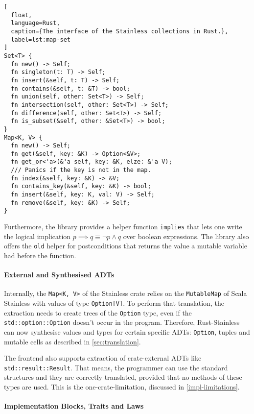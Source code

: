 \begin{lstlisting}[
  float,
  language=Rust,
  caption={The interface of the Stainless collections in Rust.},
  label=lst:map-set
]
Set<T> {
  fn new() -> Self;
  fn singleton(t: T) -> Self;
  fn insert(&self, t: T) -> Self;
  fn contains(&self, t: &T) -> bool;
  fn union(self, other: Set<T>) -> Self;
  fn intersection(self, other: Set<T>) -> Self;
  fn difference(self, other: Set<T>) -> Self;
  fn is_subset(&self, other: &Set<T>) -> bool;
}
Map<K, V> {
  fn new() -> Self;
  fn get(&self, key: &K) -> Option<&V>;
  fn get_or<'a>(&'a self, key: &K, elze: &'a V);
  /// Panics if the key is not in the map.
  fn index(&self, key: &K) -> &V;
  fn contains_key(&self, key: &K) -> bool;
  fn insert(&self, key: K, val: V) -> Self;
  fn remove(&self, key: &K) -> Self;
}
\end{lstlisting}

Furthermore, the library provides a helper function \lstinline!implies! that
lets one write the logical implication $p \implies q \equiv \neg{p} \land q$
over boolean expressions. The library also  offers the \lstinline!old! helper
for postconditions that  returns the value a mutable variable had before the
function.



\paragraph{External and Synthesised ADTs}

Internally, the \lstinline!Map<K, V>! of the Stainless crate relies on the
\lstinline!MutableMap! of Scala Stainless with values of type
\lstinline!Option[V]!. To perform that translation, the extraction needs to
create trees of the \lstinline!Option! type, even if the
\lstinline!std::option::Option! doesn't occur in the program. Therefore,
Rust-Stainless can now synthesise values and types for certain specific ADTs:
\lstinline!Option!, tuples and mutable cells as described in
\autoref{sec:translation}.

The frontend also supports extraction of crate-external ADTs like
\lstinline!std::result::Result!. That means, the programmer can use the standard
structures and they are correctly translated, provided that no methods of these
types are used. This is the one-crate-limitation, discussed in
\autoref{impl-limitations}.

\paragraph{Implementation Blocks, Traits and Laws}

